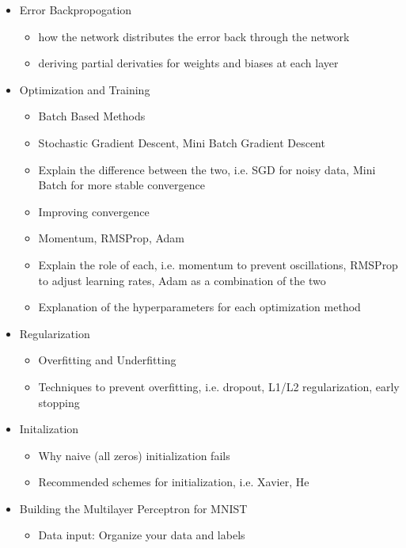 \documentclass[9pt]{extarticle}
\begin{document}
\begin{itemize}
    \item Error Backpropogation
          \begin{itemize}
              \item how the network distributes the error back through the network
              \item deriving partial derivaties for weights and biases at each layer
          \end{itemize}
    \item Optimization and Training
          \begin{itemize}
              \item Batch Based Methods
              \item Stochastic Gradient Descent, Mini Batch Gradient Descent
              \item Explain the difference between the two, i.e. SGD for noisy data, Mini Batch for more stable convergence
              \item Improving convergence
              \item Momentum, RMSProp, Adam
              \item Explain the role of each, i.e. momentum to prevent oscillations, RMSProp to adjust learning rates, Adam as a combination of the two
              \item Explanation of the hyperparameters for each optimization method
          \end{itemize}
    \item Regularization
          \begin{itemize}
              \item Overfitting and Underfitting
              \item Techniques to prevent overfitting, i.e. dropout, L1/L2 regularization, early stopping
          \end{itemize}
    \item Initalization
          \begin{itemize}
              \item Why naive (all zeros) initialization fails
              \item Recommended schemes for initialization, i.e. Xavier, He
          \end{itemize}
    \item Building the Multilayer Perceptron for MNIST
          \begin{itemize}
              \item Data input: Organize your data and labels

\end{itemize}
\end{itemize}
\end{document}
